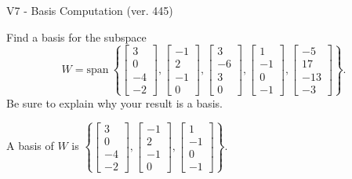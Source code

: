 \begin{exercise}
  \begin{exerciseTitle}V7 - Basis Computation (ver. 445)\end{exerciseTitle}
  \begin{exerciseStatement}
    Find a basis for the subspace 
\[W=\mathrm{span}\ \left\{\left[\begin{array}{r}
3 \\
0 \\
-4 \\
-2
\end{array}\right] , \left[\begin{array}{r}
-1 \\
2 \\
-1 \\
0
\end{array}\right] , \left[\begin{array}{r}
3 \\
-6 \\
3 \\
0
\end{array}\right] , \left[\begin{array}{r}
1 \\
-1 \\
0 \\
-1
\end{array}\right] , \left[\begin{array}{r}
-5 \\
17 \\
-13 \\
-3
\end{array}\right]\right\}.\]
 Be sure to explain why your result is a basis.


  \end{exerciseStatement}
  \begin{exerciseAnswer}
   A basis of \(W\) is  \(\left\{\left[\begin{array}{r}
3 \\
0 \\
-4 \\
-2
\end{array}\right] , \left[\begin{array}{r}
-1 \\
2 \\
-1 \\
0
\end{array}\right] , \left[\begin{array}{r}
1 \\
-1 \\
0 \\
-1
\end{array}\right]\right\}\).
  


  \end{exerciseAnswer}
\end{exercise}